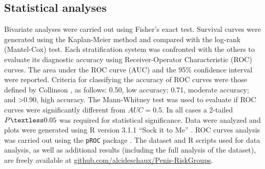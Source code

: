 \documentclass[11pt,letterpaper]{article}\usepackage[]{graphicx}\usepackage[]{color}
\begin{document}
\begin{multicols}{2}
\subsection*{Statistical analyses}
Bivariate analyses were carried out using Fisher's exact test. Survival curves were generated using the Kaplan-Meier method and compared with the log-rank (Mantel-Cox) test. Each stratification system was confronted with the others to evaluate its diagnostic accuracy using Receiver-Operator Characteristic (ROC) curves. The area under the ROC curve (AUC) and the 95\% confidence interval were reported. Criteria for classifying the accuracy of ROC curves were those defined by Collinson \cite{Collinson1998}, as follows: 0.50, low accuracy; 0.71, moderate accuracy; and \textgreater 0.90, high accuracy. The Mann-Whitney test was used to evaluate if ROC curves were significantly different from $AUC = 0.5$. In all cases a 2-tailed $P\textless 0.05$ was required for statistical significance. Data were analyzed and plots were generated using R version 3.1.1 ``Sock it to Me'' \cite{RCoreTeam}. ROC curves analysis was carried out using the \texttt{pROC} package \cite{Robin2011}. The dataset and R scripts used for data analysis, as well as additional results (including the full analysis of the dataset), are freely available at \href{https://github.com/alcideschaux/Penis-RiskGroups}{github.com/alcideschaux/Penis-RiskGroups}.


\end{multicols}
\end{document}
